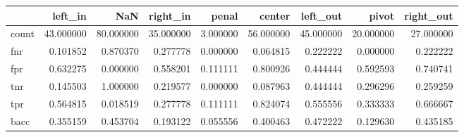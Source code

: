 \begin{tabular}{lrrrrrrrr}
\toprule
{} &    left\_in &        NaN &   right\_in &     penal &     center &   left\_out &      pivot &  right\_out \\
\midrule
count &  43.000000 &  80.000000 &  35.000000 &  3.000000 &  56.000000 &  45.000000 &  20.000000 &  27.000000 \\
fnr   &   0.101852 &   0.870370 &   0.277778 &  0.000000 &   0.064815 &   0.222222 &   0.000000 &   0.222222 \\
fpr   &   0.632275 &   0.000000 &   0.558201 &  0.111111 &   0.800926 &   0.444444 &   0.592593 &   0.740741 \\
tnr   &   0.145503 &   1.000000 &   0.219577 &  0.000000 &   0.087963 &   0.444444 &   0.296296 &   0.259259 \\
tpr   &   0.564815 &   0.018519 &   0.277778 &  0.111111 &   0.824074 &   0.555556 &   0.333333 &   0.666667 \\
bacc  &   0.355159 &   0.453704 &   0.193122 &  0.055556 &   0.400463 &   0.472222 &   0.129630 &   0.435185 \\
\bottomrule
\end{tabular}
